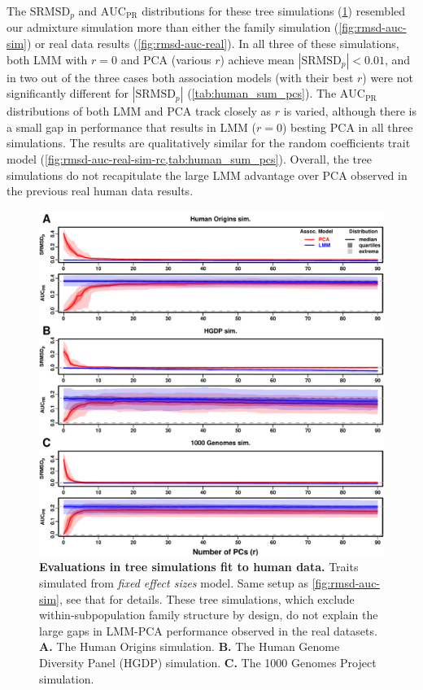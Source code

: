 \documentclass[11pt]{article}
\newcommand{\rmsd}{\text{SRMSD}_p}
\newcommand{\auc}{\text{AUC}_\text{PR}}
\begin{document}
The $\rmsd$ and $\auc$ distributions for these tree simulations (\cref{fig:rmsd-auc-real-sim}) resembled our admixture simulation more than either the family simulation (\cref{fig:rmsd-auc-sim}) or real data results (\cref{fig:rmsd-auc-real}).
In all three of these simulations, both LMM with $r=0$ and PCA (various $r$) achieve mean $|\rmsd| < 0.01$, and in two out of the three cases both association models (with their best $r$) were not significantly different for $|\rmsd|$ (\cref{tab:human_sum_pcs}).
The $\auc$ distributions of both LMM and PCA track closely as $r$ is varied, although there is a small gap in performance that results in LMM ($r=0$) besting PCA in all three simulations.
The results are qualitatively similar for the random coefficients trait model (\cref{fig:rmsd-auc-real-sim-rc,tab:human_sum_pcs}).
Overall, the tree simulations do not recapitulate the large LMM advantage over PCA observed in the previous real human data results.

\begin{figure}[bp!]
  \centering
  \includegraphics[width=\textwidth,height=\textheight,keepaspectratio]{fes/rmsd-auc-real-sim.pdf}
  \caption{
    {\small 
      {\bf Evaluations in tree simulations fit to human data.}
      Traits simulated from \textit{fixed effect sizes} model.
      Same setup as \cref{fig:rmsd-auc-sim}, see that for details.
      These tree simulations, which exclude within-subpopulation family structure by design, do not explain the large gaps in LMM-PCA performance observed in the real datasets.
      \textbf{A.}
      The Human Origins simulation.
      \textbf{B.}
      The Human Genome Diversity Panel (HGDP) simulation.
      \textbf{C.}
      The 1000 Genomes Project simulation.
    }
  }
  \label{fig:rmsd-auc-real-sim}
\end{figure}
\end{document}
